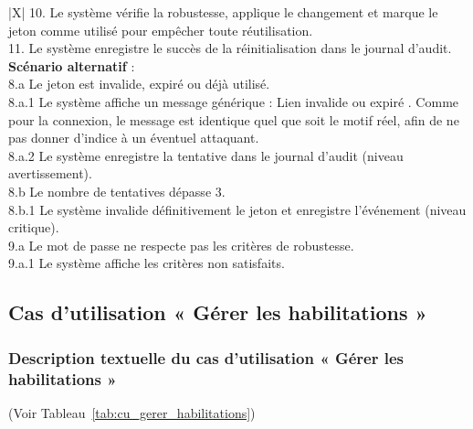 \begin{xltabular}{\linewidth}{|X|}
    10. Le système vérifie la robustesse, applique le changement et marque le jeton comme utilisé pour empêcher toute réutilisation. \\
    11. Le système enregistre le succès de la réinitialisation dans le journal d'audit. \\
    \hline
    \textbf{Scénario alternatif} : \\
    8.a Le jeton est invalide, expiré ou déjà utilisé. \\
    \hspace{0.5cm} 8.a.1 Le système affiche un message générique : \og Lien invalide ou expiré \fg. Comme pour la connexion, le message est identique quel que soit le motif réel, afin de ne pas donner d'indice à un éventuel attaquant. \\
    \hspace{0.5cm} 8.a.2 Le système enregistre la tentative dans le journal d'audit (niveau avertissement). \\
    8.b Le nombre de tentatives dépasse 3. \\
    \hspace{0.5cm} 8.b.1 Le système invalide définitivement le jeton et enregistre l'événement (niveau critique). \\
    9.a Le mot de passe ne respecte pas les critères de robustesse. \\
    \hspace{0.5cm} 9.a.1 Le système affiche les critères non satisfaits. \\
    \hline
\caption{Description textuelle du CU « Réinitialiser le mot de passe »}
\label{tab:cu_reset_password}
\end{xltabular}

\subsection{Cas d'utilisation « Gérer les habilitations »}

\subsubsection{Description textuelle du cas d'utilisation « Gérer les habilitations »}
(Voir Tableau~\ref{tab:cu_gerer_habilitations})

